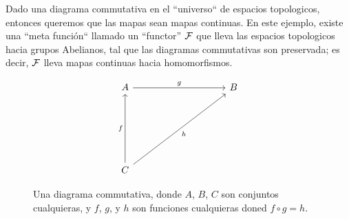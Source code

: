 Dado una diagrama commutativa en el ``universo`` de espacios topologicos,
entonces queremos que las mapas sean mapas continuas. En este ejemplo, existe
una ``meta funci\'on`` llamado un ``functor'' $\mathcal{F}$ que lleva las espacios
topologicos hacia grupos Abelianos, tal que las diagramas commutativas son
preservada; es decir,  $\mathcal{F}$ lleva mapas continuas hacia homomorfismos.

 \begin{figure}[h]
    \centering
\[\begin{tikzcd}
	A &&&& B \\
	\\
	\\
	\\
	C
	\arrow["f", from=5-1, to=1-1]
	\arrow["g", from=1-1, to=1-5]
	\arrow["h"', from=5-1, to=1-5]
\end{tikzcd}\]
    \caption{Una diagrama commutativa, donde $A$, $B$,  $C$ son conjuntos
    cualquieras, y $f$,  $g$, y  $h$ son funciones cualquieras doned  $f \circ
g=h$.}
    \label{fig_4}
\end{figure}

